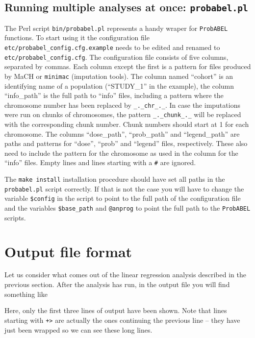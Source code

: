 \documentclass[12pt,a4paper]{article}
\newcommand{\PA}{\texttt{ProbABEL}}
\begin{document}
\subsection{Running multiple analyses at once: \texttt{probabel.pl}}
The Perl script \texttt{bin/probabel.pl} represents a handy wraper for
\PA{} functions.  To start using it the configuration file
\texttt{etc/probabel\_config.cfg.example} needs to be edited and
renamed to \texttt{etc/probabel\_config.cfg}. The configuration file
consists of five columns, separated by commas. Each column except the
first is a pattern for files produced by MaCH or \texttt{minimac}
(imputation tools). The column named ``cohort'' is an identifying name
of a population (``STUDY\_1'' in the example), the column
``info\_path'' is the full path to ``info'' files, including a pattern
where the chromosome number has been replaced by
\texttt{\_.\_chr\_.\_}. In case the imputations were run on chunks of
chromosomes, the pattern \texttt{\_.\_chunk\_.\_} will be replaced
with the corresponding chunk number. Chunk numbers should start at 1
for each chromosome. The columns ``dose\_path'', ``prob\_path''
and ``legend\_path'' are paths and patterns for ``dose'', ``prob'' and
``legend'' files, respectively. These also need to include the pattern
for the chromosome as used in the column for the ``info'' files.
Empty lines and lines starting with a \texttt{\#} are ignored.

The \texttt{make install} installation procedure should have set all
paths in the \texttt{probabel.pl} script correctly. If that is not the
case you will have to change the variable \texttt{\$config} in the
script to point to the full path of the configuration file and the
variables \texttt{\$base\_path} and \texttt{@anprog} to point the full
path to the \PA{} scripts.


\section{Output file format}
Let us consider what comes out of the linear regression analysis
described in the previous section. After the analysis has run, in
the output file you will find something like
\begin{small}

\end{small}

Here, only the first three lines of output have been shown. Note that lines
starting with \texttt{+>} are actually the ones continuing the
previous line -- they have just been wrapped so we can see
these long lines.
\end{document}
